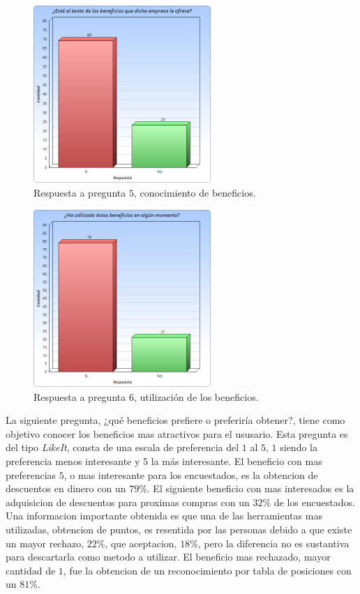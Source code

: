 \begin{figure}[!htb]
  \centering
  \includegraphics[width=0.6\textwidth]{images/Graficos/graf_5_3.png}
  \caption[chart5.3]{Respuesta a pregunta $5$, conocimiento de beneficios.}
  \label{fig:chart5.3}
\end{figure}

\begin{figure}[!htb]
  \centering
  \includegraphics[width=0.6\textwidth]{images/Graficos/graf_5_4.png}
  \caption[chart5.4]{Respuesta a pregunta $6$, utilización de los beneficios.}
  \label{fig:chart5.4}
\end{figure}


La siguiente pregunta, ¿qué beneficios prefiere o preferiría obtener?, tiene como objetivo conocer los
 beneficios mas atractivos para el ususario. Esta pregunta es del tipo \emph{LikeIt}, consta de una 
escala de preferencia del $1$ al $5$, $1$ siendo la preferencia menos interesante y 5 la más interesante.
 El beneficio con mas preferencias $5$, o mas interesante para los encuestados, es la obtencion de
descuentos en dinero con un $79\%$. El siguiente beneficio con mas interesados es la adquisicion 
de descuentos para proximas compras con un $32\%$ de los encuestados. Una informacion importante 
obtenida es que una de las herramientas mas utilizadas, obtencion de puntos, es resentida por las
personas debido a que existe un mayor rechazo, $22\%$, que aceptacion, $18\%$, pero la diferencia 
no es sustantiva para descartarla como metodo a utilizar.
El beneficio mas rechazado, mayor cantidad de $1$, fue la obtencion de un reconocimiento por tabla
 de posiciones con un $81\%$.


